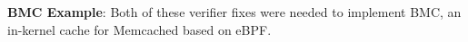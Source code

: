 %
%
%    
%
%
%    

\noindent\textbf{BMC Example}:
Both of these verifier fixes were needed to implement BMC, an in-kernel cache for Memcached
    based on eBPF.

